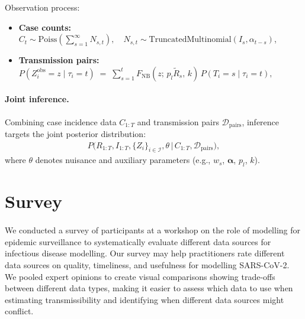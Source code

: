 \documentclass{article}
\begin{document}
Observation process:
\begin{itemize}
    \item \textbf{Case counts:} $C_t \sim \mathrm{Poiss}\left(\sum_{s=1}^\infty N_{s,t}\right), \quad N_{s,t} \sim \mathrm{TruncatedMultinomial}(I_s, \alpha_{t-s})$,

    \item \textbf{Transmission pairs:} $P(Z^{\text{obs}}_i=z \mid \tau_i=t) \;=\; \sum_{s=1}^{t} F_{\mathrm{NB}}\!\left(z;\, p_l \tilde{R}_s,\, k\right) \, P(T_i=s \mid \tau_i=t),$
\end{itemize}

\paragraph{Joint inference.}
Combining case incidence data $C_{1:T}$ and transmission pairs $\mathcal{D}_{\mathrm{pairs}}$, inference targets the joint posterior distribution:
\begin{align}
P\big(R_{1:T}, I_{1:T}, \{Z_i\}_{i\in\mathcal{I}}, \theta \,\big|\, C_{1:T}, \mathcal{D}_{\mathrm{pairs}}\big),
\end{align}
where $\theta$ denotes nuisance and auxiliary parameters (e.g., $w_s$, $\boldsymbol{\alpha}$, $p_l$, $k$).  


\newpage

\section{Survey}
\paragraph{}We conducted a survey of participants at a workshop on the role of modelling for epidemic surveillance to systematically evaluate different data sources for infectious disease modelling.
Our survey may help practitioners rate different data sources on quality, timeliness, and usefulness for modelling SARS-CoV-2. We pooled expert opinions to create visual comparisons showing trade-offs between different data types, making it easier to assess which data to use when estimating transmissibility and identifying when different data sources might conflict.
\end{document}
